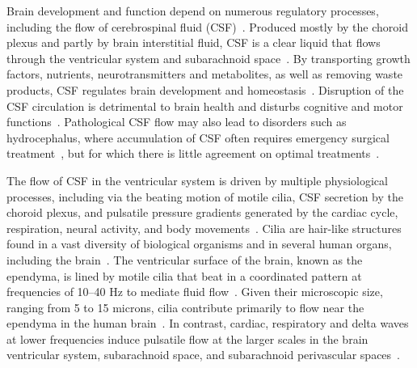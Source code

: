 \documentclass{WileyMSP-template}
\begin{document}
Brain development and function depend on numerous regulatory
processes, including the flow of cerebrospinal fluid
(CSF)~\cite{fame2020emergence}. Produced mostly by the choroid
plexus and partly by brain interstitial fluid,
CSF is a clear liquid that flows through the ventricular system and subarachnoid
space~\cite{Brodal2016, Damkier2013}. By transporting growth factors, nutrients, neurotransmitters
and metabolites, as well as removing waste products, CSF regulates
brain development and homeostasis~\cite{Ringers2020Role, fame2020emergence, del2010ependymal}.
Disruption of the CSF circulation is detrimental to brain health and disturbs
cognitive and motor functions~\cite{Johanson2008}.
Pathological CSF flow may also lead to
disorders such as hydrocephalus, where accumulation of
CSF often requires emergency surgical
treatment~\cite{duy2022rethinking, kahle2024paediatric, wallmeier2022role},
but for which there is little agreement on optimal treatments~\cite{flannery2014pediatric}. 

The flow of CSF in the ventricular system is driven by multiple
physiological processes, including via the beating motion of motile
cilia, CSF secretion by the choroid plexus, and pulsatile pressure
gradients generated by the cardiac cycle, respiration, neural
activity, and body movements~\cite{Brodal2016, del2010ependymal,
  Ringers2020Role, Vinje2019RespiratoryMeasurements,
  Kurtcuoglu2005ComputationalSystem, Olstad2019CiliaryDevelopment,
  macaulay2022cerebrospinal, mestre2018flow}.  Cilia are hair-like
structures found in a vast diversity of biological organisms and in
several human organs, including the brain~\cite{DGama2025MotileBrain,
  Fulford1986Muco-ciliaryLung, Pacherres2022CiliaryProduction,
  Jahn1972LocomotionProtozoa, Brennen1977FluidFlagella,
  Ringers2020Role, spassky2013motile, Pellicciotta2020Cilia,
  mitchell2007evolution, Tsukita2012CoordinatedFeet,
  BLAKE1974MechanicsMotion,
  Reiten2017Motile-Cilia-MediatedComputations,
  Thouvenin2020OriginCanal}.  The ventricular surface of the brain,
known as the ependyma, is lined by motile cilia that beat in a
coordinated pattern at frequencies of 10--40 Hz to mediate fluid
flow~\cite{mitchell2007evolution, Ringers2020Role, spassky2013motile,
  Ringers2023NovelEpithelia, roth2025structure}.  Given their
microscopic size, ranging from 5 to 15 microns, cilia contribute
primarily to flow near the ependyma in the human
brain~\cite{Siyahhan2014FlowVentricles, Olstad2019CiliaryDevelopment,
  Ringers2020Role, Faubel2016Cilia-basedVentricles}. In contrast,
cardiac, respiratory and delta waves at lower frequencies induce
pulsatile flow at the larger scales in the brain ventricular system,
subarachnoid space, and subarachnoid perivascular
spaces~\cite{Vinje2019RespiratoryMeasurements, eide2024functional,
  Causemann2025, fultz2019coupled, mestre2018flow,
  daversin2020mechanisms}.
\end{document}

